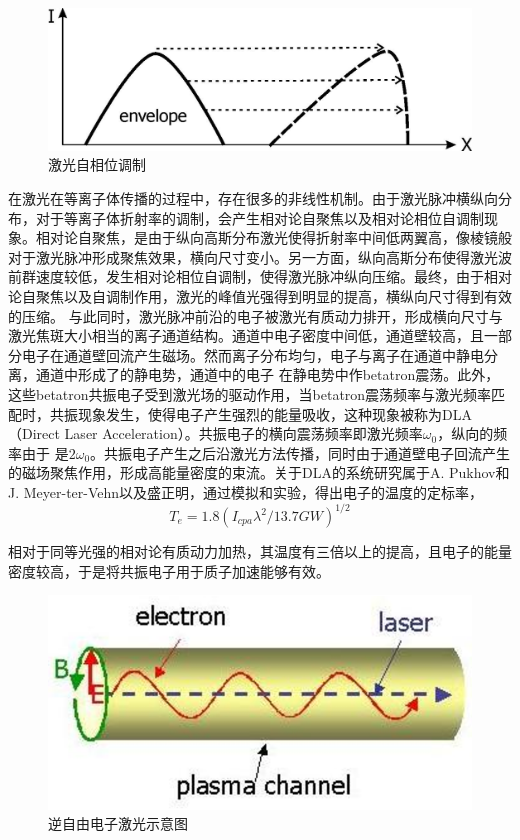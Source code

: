 \begin{figure}[!htbp]
  \centering
  \includegraphics[width=\MyFactor\textwidth]{Img/prof-steepening.eps}
  \caption{激光自相位调制}
  \label{fig:phaseModulate}
\end{figure}




在激光在等离子体传播的过程中，存在很多的非线性机制。由于激光脉冲横纵向分布，对于等离子体折射率的调制，会产生相对论自聚焦以及相对论相位自调制现象。相对论自聚焦，是由于纵向高斯分布激光使得折射率中间低两翼高，像棱镜般对于激光脉冲形成聚焦效果，横向尺寸变小。另一方面，纵向高斯分布使得激光波前群速度较低，发生相对论相位自调制，使得激光脉冲纵向压缩。最终，由于相对论自聚焦以及自调制作用，激光的峰值光强得到明显的提高，横纵向尺寸得到有效的压缩\cite{wang2011laser}。
与此同时，激光脉冲前沿的电子被激光有质动力排开，形成横向尺寸与激光焦斑大小相当的离子通道结构。通道中电子密度中间低，通道壁较高，且一部分电子在通道壁回流产生磁场。然而离子分布均匀，电子与离子在通道中静电分离，通道中形成了的静电势，通道中的电子  在静电势中作betatron震荡。此外，这些betatron共振电子受到激光场的驱动作用，当betatron震荡频率与激光频率匹配时，共振现象发生，使得电子产生强烈的能量吸收，这种现象被称为DLA（Direct Laser Acceleration）。共振电子的横向震荡频率即激光频率$\omega_0$，纵向的频率由于  是$2 \omega_0$。共振电子产生之后沿激光方法传播，同时由于通道壁电子回流产生的磁场聚焦作用，形成高能量密度的束流。关于DLA的系统研究属于A. Pukhov和J. Meyer-ter-Vehn以及盛正明\cite{pukhov1998relativistic,pukhov1999particle}，通过模拟和实验，得出电子的温度的定标率，
\begin{equation}
\label{eqn:DLAtemperature}
T_e = 1.8(I_{cpa} {\lambda}^2/{13.7}GW)^{1/2}
\end{equation} 

相对于同等光强的相对论有质动力加热，其温度有三倍以上的提高，且电子的能量密度较高，于是将共振电子用于质子加速能够有效。

\begin{figure}[!htbp]
  \centering
  \includegraphics[width=\MyFactor\textwidth]{Img/IFEL.eps}
  \caption{逆自由电子激光示意图}
  \label{fig:IFEL}
\end{figure}


